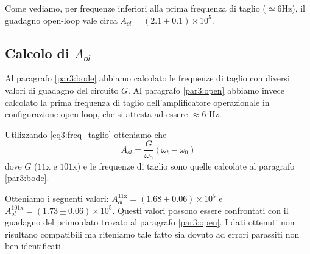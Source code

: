 Come vediamo, per frequenze inferiori alla prima frequenza di taglio ($\simeq 6 \si{\hertz}$), il guadagno open-loop vale circa $A_{ol}=(2.1\pm0.1)\times 10^5$.


\subsection{Calcolo di $A_{ol}$}
\label{par3:A_ol}

Al paragrafo \ref{par3:bode} abbiamo calcolato le frequenze di taglio con diversi valori di guadagno del circuito $G$. Al paragrafo \ref{par3:open} abbiamo invece calcolato la prima frequenza di taglio dell'amplificatore operazionale in configurazione open loop, che si attesta ad essere $\approx 6$ \si{\hertz}.

Utilizzando \ref{eq3:freq_taglio} otteniamo che
$$A_{ol} = \frac{G}{\omega_0} (\omega_t - \omega_0)$$
dove $G$ ($11\mathrm{x}$ e $101\mathrm{x}$) e le frequenze di taglio sono quelle calcolate al paragrafo \ref{par3:bode}.

Otteniamo i seguenti valori: $A_{ol}^{11\mathrm{x}} = (1.68\pm 0.06)\times 10^5$ e $A_{ol}^{101\mathrm{x}} = (1.73\pm 0.06)\times 10^5$. Questi valori possono essere confrontati con il guadagno del primo dato trovato al paragrafo \ref{par3:open}. I dati ottenuti non risultano compatibili ma riteniamo tale fatto sia dovuto ad errori parassiti non ben identificati.
